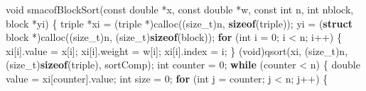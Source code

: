 \documentclass[
  12pt,
  letterpaper,
  DIV=11,
  numbers=noendperiod]{scrreprt}
\newenvironment{Shaded}{\begin{snugshade}}{\end{snugshade}}
\newcommand{\ControlFlowTok}[1]{\textcolor[rgb]{0.00,0.23,0.31}{\textbf{#1}}}
\newcommand{\DataTypeTok}[1]{\textcolor[rgb]{0.68,0.00,0.00}{#1}}
\newcommand{\DecValTok}[1]{\textcolor[rgb]{0.68,0.00,0.00}{#1}}
\newcommand{\KeywordTok}[1]{\textcolor[rgb]{0.00,0.23,0.31}{\textbf{#1}}}
\newcommand{\NormalTok}[1]{\textcolor[rgb]{0.00,0.23,0.31}{#1}}
\newcommand{\OperatorTok}[1]{\textcolor[rgb]{0.37,0.37,0.37}{#1}}
\theoremstyle{remark}
\begin{document}
\begin{Shaded}
\begin{Highlighting}[]
\DataTypeTok{void}\NormalTok{ smacofBlockSort}\OperatorTok{(}\DataTypeTok{const} \DataTypeTok{double} \OperatorTok{*}\NormalTok{x}\OperatorTok{,} \DataTypeTok{const} \DataTypeTok{double} \OperatorTok{*}\NormalTok{w}\OperatorTok{,} \DataTypeTok{const} \DataTypeTok{int}\NormalTok{ n}\OperatorTok{,} \DataTypeTok{int}\NormalTok{ nblock}\OperatorTok{,}
\NormalTok{                 block }\OperatorTok{*}\NormalTok{yi}\OperatorTok{)} \OperatorTok{\{}
\NormalTok{    triple }\OperatorTok{*}\NormalTok{xi }\OperatorTok{=} \OperatorTok{(}\NormalTok{triple }\OperatorTok{*)}\NormalTok{calloc}\OperatorTok{((}\DataTypeTok{size\_t}\OperatorTok{)}\NormalTok{n}\OperatorTok{,} \KeywordTok{sizeof}\OperatorTok{(}\NormalTok{triple}\OperatorTok{));}
\NormalTok{    yi }\OperatorTok{=} \OperatorTok{(}\KeywordTok{struct}\NormalTok{ block }\OperatorTok{*)}\NormalTok{calloc}\OperatorTok{((}\DataTypeTok{size\_t}\OperatorTok{)}\NormalTok{n}\OperatorTok{,} \OperatorTok{(}\DataTypeTok{size\_t}\OperatorTok{)}\KeywordTok{sizeof}\OperatorTok{(}\NormalTok{block}\OperatorTok{));}
    \ControlFlowTok{for} \OperatorTok{(}\DataTypeTok{int}\NormalTok{ i }\OperatorTok{=} \DecValTok{0}\OperatorTok{;}\NormalTok{ i }\OperatorTok{\textless{}}\NormalTok{ n}\OperatorTok{;}\NormalTok{ i}\OperatorTok{++)} \OperatorTok{\{}
\NormalTok{        xi}\OperatorTok{[}\NormalTok{i}\OperatorTok{].}\NormalTok{value }\OperatorTok{=}\NormalTok{ x}\OperatorTok{[}\NormalTok{i}\OperatorTok{];}
\NormalTok{        xi}\OperatorTok{[}\NormalTok{i}\OperatorTok{].}\NormalTok{weight }\OperatorTok{=}\NormalTok{ w}\OperatorTok{[}\NormalTok{i}\OperatorTok{];}
\NormalTok{        xi}\OperatorTok{[}\NormalTok{i}\OperatorTok{].}\NormalTok{index }\OperatorTok{=}\NormalTok{ i}\OperatorTok{;}
    \OperatorTok{\}}
    \OperatorTok{(}\DataTypeTok{void}\OperatorTok{)}\NormalTok{qsort}\OperatorTok{(}\NormalTok{xi}\OperatorTok{,} \OperatorTok{(}\DataTypeTok{size\_t}\OperatorTok{)}\NormalTok{n}\OperatorTok{,} \OperatorTok{(}\DataTypeTok{size\_t}\OperatorTok{)}\KeywordTok{sizeof}\OperatorTok{(}\NormalTok{triple}\OperatorTok{),}\NormalTok{ sortComp}\OperatorTok{);}
    \DataTypeTok{int}\NormalTok{ counter }\OperatorTok{=} \DecValTok{0}\OperatorTok{;}
    \ControlFlowTok{while} \OperatorTok{(}\NormalTok{counter }\OperatorTok{\textless{}}\NormalTok{ n}\OperatorTok{)} \OperatorTok{\{}
        \DataTypeTok{double}\NormalTok{ value }\OperatorTok{=}\NormalTok{ xi}\OperatorTok{[}\NormalTok{counter}\OperatorTok{].}\NormalTok{value}\OperatorTok{;}
        \DataTypeTok{int}\NormalTok{ size }\OperatorTok{=} \DecValTok{0}\OperatorTok{;}
        \ControlFlowTok{for} \OperatorTok{(}\DataTypeTok{int}\NormalTok{ j }\OperatorTok{=}\NormalTok{ counter}\OperatorTok{;}\NormalTok{ j }\OperatorTok{\textless{}}\NormalTok{ n}\OperatorTok{;}\NormalTok{ j}\OperatorTok{++)} \OperatorTok{\{}

\end{Highlighting}
\end{Shaded}
\end{document}
